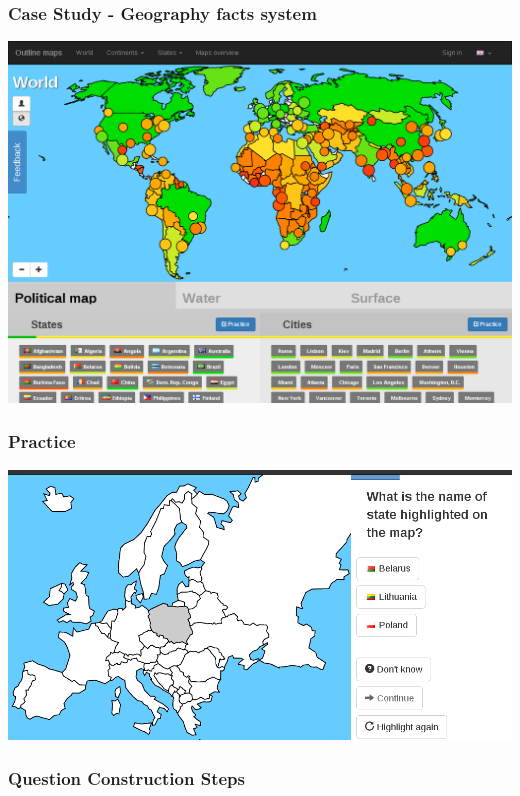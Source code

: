 \documentclass[xcolor=svgnames]{beamer}
\begin{document}
\begin{frame}
	\frametitle{Case Study - Geography facts system}
   \includegraphics[width=\textwidth]{img/knowledge-map-world-en.png}
\end{frame}
\begin{frame}
	\frametitle{Practice}
   \includegraphics[width=\textwidth]{img/practice-example-en.png}
\end{frame}
\begin{frame}
	\frametitle{Question Construction Steps}
\end{frame}
\end{document}
